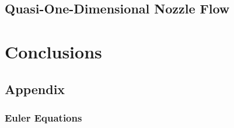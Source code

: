 \documentclass[12pt,fleqn]{report}
\begin{document}
\section{Quasi-One-Dimensional Nozzle Flow}
\label{sec:q1dnf}


\chapter{Conclusions}
\label{ch:conc}


\clearpage
\appendix
\section*{Appendix}
\renewcommand{\thesubsection}{\Alph{subsection}}


\subsection{Euler Equations}
\label{app:euler}
\renewcommand{\theequation}{A.\arabic{equation}}

\clearpage


\end{document}
